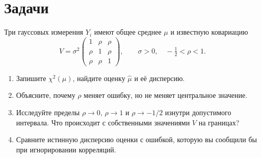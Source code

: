 \documentclass[
  russian,
  11pt,
  a4paper,
  open=any]{scrbook}
\providecommand{\tightlist}{%
  \setlength{\itemsep}{0pt}\setlength{\parskip}{0pt}}
\begin{document}
\section{Задачи}\label{ux437ux430ux434ux430ux447ux438-11}

\begin{semanticpdfbox}[colback=BookCoralSoft,borderline west={1.2mm}{0pt}{BookCoral}]

\par\nopagebreak[4]\vspace{1.2mm}

Три гауссовых измерения \(Y_i\) имеют общее среднее \(\mu\) и известную
ковариацию \[
V=\sigma^2
\begin{pmatrix}
1&\rho&\rho\\
\rho&1&\rho\\
\rho&\rho&1
\end{pmatrix},
\qquad \sigma>0,\quad -\tfrac12<\rho<1.
\]

\begin{enumerate}
\def\labelenumi{\arabic{enumi}.}
\tightlist
\item
  Запишите \(\chi^2(\mu)\), найдите оценку \(\widehat\mu\) и её
  дисперсию.
\item
  Объясните, почему \(\rho\) меняет ошибку, но не меняет центральное
  значение.
\item
  Исследуйте пределы \(\rho\to0\), \(\rho\to1\) и \(\rho\to-1/2\)
  изнутри допустимого интервала. Что происходит с собственными
  значениями \(V\) на границах?
\item
  Сравните истинную дисперсию оценки с ошибкой, которую вы сообщили бы
  при игнорировании корреляций.
\end{enumerate}

\end{semanticpdfbox}
\end{document}
